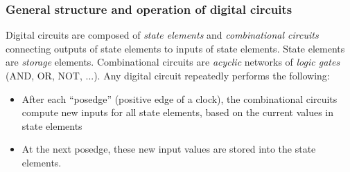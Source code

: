 \begin{frame}
\frametitle{General structure and operation of digital circuits}

\begin{center}
\end{center}

Digital circuits are composed of \emph{state elements} and
\emph{combinational circuits} connecting outputs of state elements to
inputs of state elements.  State elements are \emph{storage} elements.
Combinational circuits are \emph{acyclic} networks of \emph{logic
gates} (AND, OR, NOT, ...).  Any digital circuit repeatedly performs
the following:

\begin{itemize}

\item After each ``posedge'' (positive edge of a clock), the
      combinational circuits compute new inputs for all state
      elements, based on the current values in state elements

\item At the next posedge, these new input values are stored into the
      state elements.

\end{itemize}

\end{frame}



